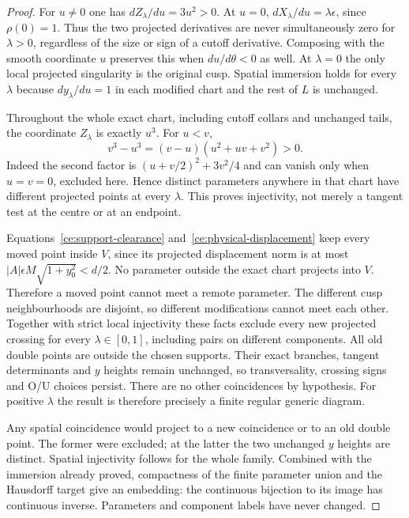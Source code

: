 \begin{proof}
For $u\ne0$ one has $dZ_\lambda/du=3u^2>0$. At $u=0$,
$dX_\lambda/du=\lambda\epsilon$, since $\rho(0)=1$. Thus the two
projected derivatives are never simultaneously zero for $\lambda>0$,
regardless of the size or sign of a cutoff derivative. Composing with
the smooth coordinate $u$ preserves this when $du/d\theta<0$ as well.
At $\lambda=0$ the only local projected singularity is the original
cusp. Spatial immersion holds for every $\lambda$ because
$dy_\lambda/du=1$ in each modified chart and the rest of $L$ is unchanged.

Throughout the whole exact chart, including cutoff collars and unchanged
tails, the coordinate $Z_\lambda$ is exactly $u^3$. For $u<v$,
\begin{equation}\label{ce:cubic-difference}
 v^3-u^3=(v-u)(u^2+uv+v^2)>0.
\end{equation}
Indeed the second factor is $(u+v/2)^2+3v^2/4$ and can vanish only when
$u=v=0$, excluded here. Hence distinct parameters anywhere in that
chart have different projected points at every $\lambda$. This proves
injectivity, not merely a tangent test at the centre or at an endpoint.

Equations~\eqref{ce:support-clearance} and~\eqref{ce:physical-displacement}
keep every moved point inside $V$, since its projected displacement norm
is at most $|A|\epsilon M\sqrt{1+y_0^2}<d/2$. No parameter outside the
exact chart projects into $V$. Therefore a moved point cannot meet a
remote parameter. The different cusp neighbourhoods are disjoint, so
different modifications cannot meet each other. Together with strict
local injectivity these facts exclude every new projected crossing for
every $\lambda\in[0,1]$, including pairs on different components.
All old double points are outside the chosen supports. Their exact
branches, tangent determinants and $y$ heights remain unchanged, so
transversality, crossing signs and O/U choices persist. There are no
other coincidences by hypothesis. For positive $\lambda$ the result is
therefore precisely a finite regular generic diagram.

Any spatial coincidence would project to a new coincidence or to an
old double point. The former were excluded; at the latter the two
unchanged $y$ heights are distinct. Spatial injectivity follows for the
whole family. Combined with the immersion already proved, compactness
of the finite parameter union and the Hausdorff target give an embedding:
the continuous bijection to its image has continuous inverse.
Parameters and component labels have never changed.


\end{proof}
